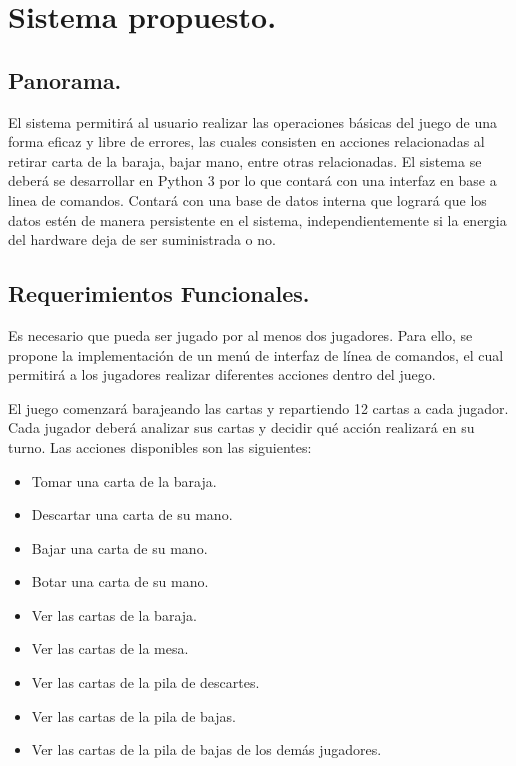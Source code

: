 \pagebreak

\section{Sistema propuesto.}\label{cap:sistema}
\subsection{Panorama.}\label{cap:panorama}
El sistema permitirá al usuario realizar las operaciones básicas del juego de una forma eficaz y libre de errores, las cuales consisten en acciones relacionadas al retirar carta de la baraja, bajar mano, entre otras relacionadas. El sistema se deberá se desarrollar en Python 3 por lo que contará con una interfaz en base a linea de comandos. Contará con una base de datos interna que logrará que los datos estén de manera persistente en el sistema, independientemente si la energia del hardware deja de ser suministrada o no.
\subsection{Requerimientos Funcionales.}\label{cap:requerimientos-funcionales}

Es necesario que pueda ser jugado por al menos dos jugadores. Para ello, se propone la implementación de un menú de interfaz de línea de comandos, el cual permitirá a los jugadores realizar diferentes acciones dentro del juego.

El juego comenzará barajeando las cartas y repartiendo 12 cartas a cada jugador. Cada jugador deberá analizar sus cartas y decidir qué acción realizará en su turno. Las acciones disponibles son las siguientes:
\begin{itemize}
  \item Tomar una carta de la baraja.
  \item Descartar una carta de su mano.
  \item Bajar una carta de su mano.
  \item Botar una carta de su mano.
  \item Ver las cartas de la baraja.
  \item Ver las cartas de la mesa.
  \item Ver las cartas de la pila de descartes.
  \item Ver las cartas de la pila de bajas.
  \item Ver las cartas de la pila de bajas de los demás jugadores.
\end{itemize}

